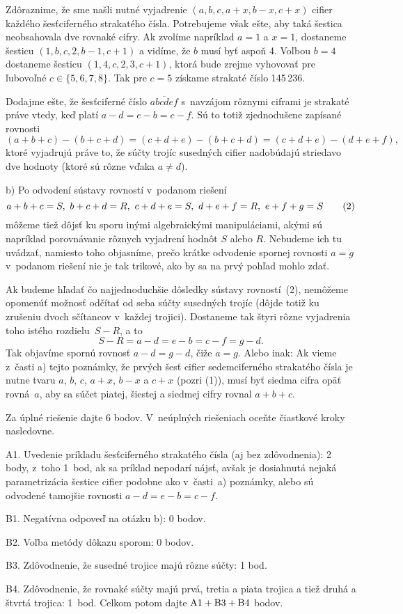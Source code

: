 {Zdôraznime, že sme našli nutné vyjadrenie $(a,b,c,a+x,b-x,c+x)$
cifier každého šesťciferného strakatého čísla. Potrebujeme však
ešte, aby taká šestica neobsahovala dve rovnaké cifry.
Ak zvolíme napríklad $a=1$ a $x=1$, dostaneme
šesticu $(1,b,c,2,b-1,{c+1})$ a vidíme, že $b$ musí byť aspoň 4.
Voľbou $b=4$ dostaneme šesticu $(1,4,c,2,3,c+1)$, ktorá bude
zrejme vyhovovať pre ľubovoľné $c\in\{5,6,7,8\}$. Tak pre
$c=5$ získame strakaté číslo 145\,236.

Dodajme ešte, že šesťciferné číslo $\overline{abcdef}$ s~navzájom
rôznymi ciframi je strakaté práve vtedy, keď platí
$a-d=e-b=c-f$. Sú to totiž zjednodušene zapísané rovnosti
$$
(a+b+c)-(b+c+d)=(c+d+e)-(b+c+d)=(c+d+e)-(d+e+f),
$$
ktoré vyjadrujú práve to, že súčty trojíc susedných cifier
nadobúdajú striedavo dve hodnoty (ktoré sú rôzne vďaka $a\ne
d$).

\smallskip
b) Po odvodení sústavy rovností v~podanom riešení
$$
a+b+c=S,\ b+c+d=R,\ c+d+e=S,\ d+e+f=R,\ e+f+g=S
\tag2
$$
môžeme tiež dôjsť ku sporu inými algebraickými manipuláciami,
akými sú napríklad porovnávanie rôznych vyjadrení hodnôt $S$ alebo
$R$. Nebudeme ich tu uvádzať, namiesto toho objasníme, prečo krátke
odvodenie spornej rovnosti $a=g$ v~podanom riešení nie je tak trikové,
ako by sa na prvý pohľad mohlo zdať.

Ak budeme hľadať čo najjednoduchšie dôsledky sústavy rovností~(2),
nemôžeme opomenúť možnosť odčítať od seba súčty
susedných trojíc (dôjde totiž ku zrušeniu dvoch sčítancov v~každej
trojici). Dostaneme tak štyri rôzne vyjadrenia toho istého
rozdielu~$S-R$, a to
$$
S-R=a-d=e-b=c-f=g-d.
$$
Tak objavíme spornú rovnosť $a-d=g-d$, čiže $a=g$.
Alebo inak:
Ak vieme z~časti a) tejto poznámky, že prvých šesť cifier
sedemciferného strakatého čísla je nutne tvaru $a$, $b$, $c$, $a+x$, $b-x$
a $c+x$ (pozri (1)), musí byť siedma cifra opäť rovná~$a$, aby sa
súčet piatej, šiestej a siedmej cifry rovnal $a+b+c$.


\schemaABC
Za úplné riešenie dajte 6 bodov. V~neúplných riešeniach oceňte čiastkové kroky nasledovne.
\item{A1.} Uvedenie príkladu šesťciferného strakatého čísla (aj bez zdôvodnenia): 2 body, z~toho 1~bod, ak sa príklad nepodarí nájsť, avšak je dosiahnutá nejaká parametrizácia šestice cifier podobne ako v~časti~a) poznámky, alebo sú odvodené tamojšie rovnosti $a-d=e-b=c-f$.
\item{B1.} Negatívna odpoveď na otázku b): 0 bodov.
\item{B2.} Voľba metódy dôkazu sporom: 0 bodov.
\item{B3.} Zdôvodnenie, že susedné trojice majú rôzne súčty: 1 bod.
\item{B4.} Zdôvodnenie, že rovnaké súčty majú prvá, tretia a piata trojica a tiež druhá a štvrtá trojica: 1~bod.
\endgraf\noindent
Celkom potom dajte $\rm A1+B3+B4$ bodov.
\endschema
}

